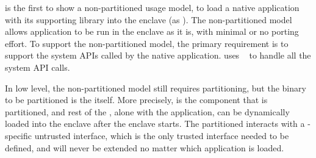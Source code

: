 \cite{baumann14haven} is the first to show a non-partitioned usage model,
to load a native application with its supporting library
into the enclave (as {\em \haven{}}).
The non-partitioned model allows application to be run in the enclave as it is, with minimal or no porting effort.
To support the non-partitioned model, the primary requirement is to support the system APIs called by the native application.
\haven{} uses \drawbridge{} \libos{}~\citep{porter11drawbridge}
to handle all the system API calls.

In low level, the non-partitioned model still requires partitioning, but the binary to be partitioned is the \libos{} itself.
More precisely, \drawbridge{} \pal{} is the component that is partitioned,
and rest of the \libos{}, alone with the application,
can be dynamically loaded into the enclave after the enclave starts.
The partitioned \drawbridge{} \pal{} interacts with a \libos{}-specific untrusted interface,
which is the only trusted interface needed to be defined,
and will never be extended no matter which application is loaded.
